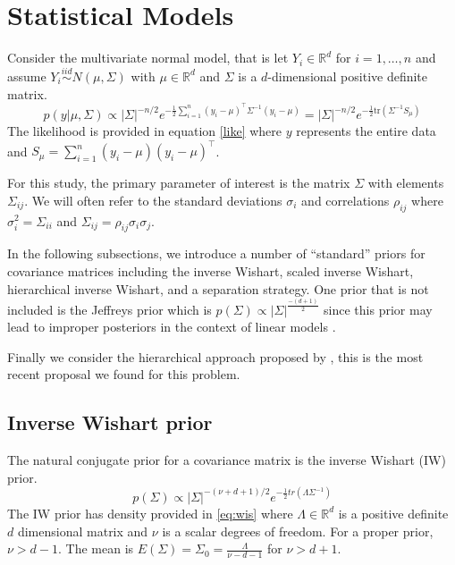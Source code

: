 \documentclass[a4paper]{article}
\begin{document}
\section{Statistical Models}

Consider the multivariate normal model, that is let $Y_i\in \mathbb{R}^d$ for $i=1,\ldots,n$ and assume $Y_i \stackrel{iid}{\sim} N(\mu, \Sigma)$ with $\mu\in \mathbb{R}^d$ and $\Sigma$ is a $d$-dimensional positive definite matrix.   
  \begin{equation}
 p(y\vert \mu,\Sigma) \propto |\Sigma|^{-n/2} e^{- \frac{1}{2} \sum_{i=1}^n (y_i-\mu)^\top \Sigma^{-1} (y_i-\mu) } = |\Sigma|^{-n/2} e^{- \frac{1}{2}  \mbox{tr}(\Sigma^{-1}S_\mu)  } 
 \label{like}
 \end{equation} 
The likelihood is provided in equation \eqref{like} where $y$ represents the entire data and  $S_\mu = \sum_{i=1}^n (y_i-\mu) (y_i-\mu) ^\top$. 


For this study, the primary parameter of interest is the matrix $\Sigma$ with elements $\Sigma_{ij}$. We will often refer to the standard deviations $\sigma_i$ and correlations $\rho_{ij}$ where $\sigma_i^2 = \Sigma_{ii}$ and $\Sigma_{ij} = \rho_{ij}\sigma_i\sigma_j$. 

In the following subsections, we introduce a number of ``standard'' priors for covariance matrices including the inverse Wishart, scaled inverse Wishart, hierarchical inverse Wishart, and a separation strategy. One prior that is not included is the Jeffreys prior which is $p(\Sigma)\propto |\Sigma| ^ {\frac{-(d+1)}{2} } $ since this prior may lead to improper posteriors in the context of linear models \citep{gelman2006prior, SIW2008}. 


 Finally we consider the hierarchical approach proposed by \cite{huang2013simple}, this is the most recent proposal we found for this problem. 

\subsection{Inverse Wishart prior}

The natural conjugate prior for a covariance matrix is the inverse Wishart (IW) prior\citep{barnard2000}. 
\begin{equation} 
p(\Sigma) \propto  |\Sigma|^{-(\nu+ d +1)/2 } e^{-\frac{1}{2} tr( \Lambda \Sigma^{-1}) }
\label{eq:wis}
\end{equation}
The IW prior has density provided in \eqref{eq:wis} where $\Lambda\in \mathbb{R}^d$ is a positive definite $d$ dimensional matrix and $\nu$ is a scalar degrees of freedom. For a proper prior, $\nu>d-1$. The mean is $E(\Sigma) = \Sigma_0= \frac{\Lambda}{\nu - d - 1}$ for $\nu>d+1$. 
\end{document}

